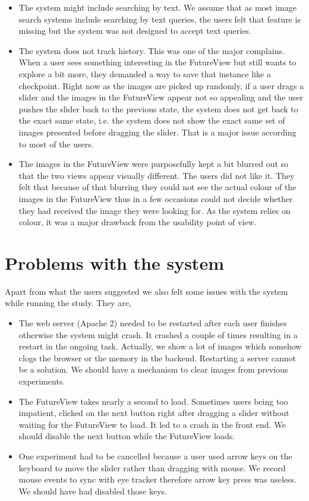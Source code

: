 \documentclass[english]{tktltiki}
\begin{document}
\begin{itemize}
	\item The system might include searching by text. We assume that as most image search systems include searching by text queries, the users felt that feature is missing but the system was not designed to accept text queries.
	\item The system does not track history. This was one of the major complains. When a user sees something interesting in the FutureView but still wants to explore a bit more, they demanded a way to save that instance like a checkpoint. Right now as the images are picked up randomly, if a user drags a slider and the images in the FutureView appear not so appealing and the user pushes the slider back to the previous state, the system does not get back to the exact same state, i.e. the system does not show the exact same set of images presented before dragging the slider. That is a major issue according to most of the users.
	\item The images in the FutureView were purposefully kept a bit blurred out so that the two views appear visually different. The users did not like it. They felt that because of that blurring they could not see the actual colour of the images in the FutureView thus in a few occasions could not decide whether they had received the image they were looking for. As the system relies on colour, it was a major drawback from the usability point of view.
\end{itemize}

\section{Problems with the system}

Apart from what the users suggested we also felt some issues with the system while running the study. They are,

\begin{itemize}
	\item The web server (Apache 2) needed to be restarted after each user finishes otherwise the system might crash. It crashed a couple of times resulting in a restart in the ongoing task. Actually, we show a lot of images which somehow clogs the browser or the memory in the backend. Restarting a server cannot be a solution. We should have a mechanism to clear images from previous experiments.
	\item The FutureView takes nearly a second to load. Sometimes users being too impatient, clicked on the next button right after dragging a slider without waiting for the FutureView to load. It led to a crash in the front end. We should disable the next button while the FutureView loads.
	\item One experiment had to be cancelled because a user used arrow keys on the keyboard to move the slider rather than dragging with mouse. We record mouse events to sync with eye tracker therefore arrow key press was useless. We should have had disabled those keys. 
\end{itemize}
\end{document}
